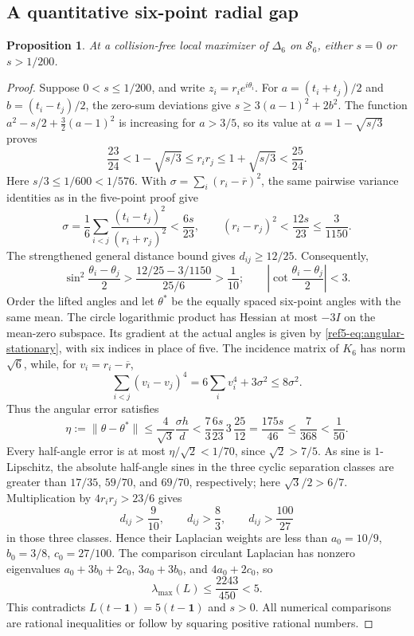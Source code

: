 \documentclass[11pt]{article}
\newtheorem{proposition}[theorem]{Proposition}
\theoremstyle{remark}
\newcommand{\one}{\mathbf 1}
\newcommand{\norm}[1]{\lVert#1\rVert}
\numberwithin{equation}{section}
\begin{document}
\subsection{A quantitative six-point radial gap}
\begin{proposition}\label{ref5-prop:six-gap}
At a collision-free local maximizer of $\Delta_6$ on $\mathcal S_6$,
either $s=0$ or $s>1/200$.
\end{proposition}
\begin{proof}
Suppose $0<s\le1/200$, and write $z_i=r_i e^{i\theta_i}$.
For $a=(t_i+t_j)/2$ and $b=(t_i-t_j)/2$, the zero-sum deviations give
$s\ge3(a-1)^2+2b^2$.
The function $a^2-s/2+\frac32(a-1)^2$ is increasing for $a>3/5$,
so its value at $a=1-\sqrt{s/3}$ proves
\[
 \frac{23}{24}<1-\sqrt{s/3}\le r_ir_j
 \le1+\sqrt{s/3}<\frac{25}{24}.
\]
Here $s/3\le1/600<1/576$.
With $\sigma=\sum_i(r_i-\overline r)^2$, the same pairwise variance
identities as in the five-point proof give
\[
 \sigma=\frac16\sum_{i<j}
       \frac{(t_i-t_j)^2}{(r_i+r_j)^2}<\frac{6s}{23},
 \qquad (r_i-r_j)^2<\frac{12s}{23}\le\frac3{1150}.
\]
The strengthened general distance bound gives $d_{ij}\ge12/25$.
Consequently,
\[
 \sin^2\frac{\theta_i-\theta_j}{2}
 >\frac{12/25-3/1150}{25/6}>\frac1{10};
 \qquad \left|\cot\frac{\theta_i-\theta_j}{2}\right|<3.
\]
Order the lifted angles and let $\theta^*$ be the equally spaced
six-point angles with the same mean. The circle logarithmic product
has Hessian at most $-3I$ on the mean-zero subspace. Its gradient
at the actual angles is given by \eqref{ref5-eq:angular-stationary}, with
six indices in place of five. The incidence matrix of $K_6$ has norm
$\sqrt6$, while, for $v_i=r_i-\overline r$,
\[
 \sum_{i<j}(v_i-v_j)^4
 =6\sum_i v_i^4+3\sigma^2\le8\sigma^2.
\]
Thus the angular error satisfies
\[
 \eta:=\norm{\theta-\theta^*}
 \le\frac4{\sqrt3}\frac{\sigma h}{d}
 <\frac73\frac{6s}{23}\,3\,\frac{25}{12}
 =\frac{175s}{46}\le\frac7{368}<\frac1{50}.
\]
Every half-angle error is at most $\eta/\sqrt2<1/70$, since
$\sqrt2>7/5$.
As sine is $1$-Lipschitz, the absolute half-angle sines in the three
cyclic separation classes are greater than $17/35$, $59/70$, and
$69/70$, respectively; here $\sqrt3/2>6/7$.
Multiplication by $4r_ir_j>23/6$ gives
\[
 d_{ij}>\frac{9}{10},\qquad d_{ij}>\frac83,\qquad
 d_{ij}>\frac{100}{27}
\]
in those three classes. Hence their Laplacian weights are less than
$a_0=10/9$, $b_0=3/8$, $c_0=27/100$.
The comparison circulant Laplacian has nonzero eigenvalues
$a_0+3b_0+2c_0$, $3a_0+3b_0$, and $4a_0+2c_0$, so
\[
 \lambda_{\max}(L)\le\frac{2243}{450}<5.
\]
This contradicts $L(t-\one)=5(t-\one)$ and $s>0$.
All numerical comparisons are rational inequalities or follow by
squaring positive rational numbers.
\end{proof}
\end{document}
